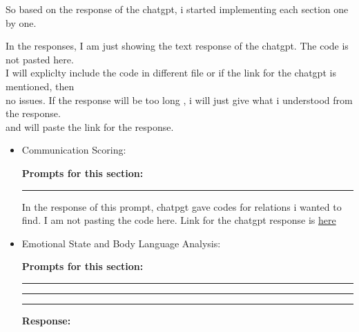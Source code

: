 \documentclass[11pt,a4paper]{article}
\begin{document}
\Large{So based on the response of the chatgpt, i started implementing each section one by one.}

\begin{tcolorbox}[colback=yellow!10!white, colframe=red!80!black, title=Note]
   In the responses, I am just showing the text response of the chatgpt. The code is not pasted here.\\
   I will expliclty include the code in different file or if the link for the chatgpt is mentioned, then \\
   no issues.
   If the response will be too long , i will just give what i understood from the response.\\
   and will paste the link for the response.
\end{tcolorbox}

\begin{itemize}
        \item Communication Scoring: {
            \textbf{Prompts for this section:}
            \begin{center}
                \color{red}\rule{1\linewidth}{0.5mm}
            \end{center}
            \begin{tcolorbox}
                
            \end{tcolorbox}
            \Large{In the response of this prompt, chatpgt gave codes for relations i wanted to find. I am not pasting the code here.
            Link for the chatgpt response is \href{https://chatgpt.com/share/66eac52b-9638-8009-aceb-bece7faa6be8}{here}}
            
        }
        \item Emotional State and Body Language Analysis: {
            \textbf{Prompts for this section:}
            \begin{center}
                \color{red}\rule{1\linewidth}{0.5mm}
            \end{center}
            \begin{tcolorbox}[title=Prompt]
                
            \end{tcolorbox}
            \begin{center}
                \color{red}\rule{1\linewidth}{0.5mm}
            \end{center}
            \begin{center}
                \color{red}\rule{1\linewidth}{0.5mm}
            \end{center}
            \textbf{Response:}

}
\end{itemize}
\end{document}
